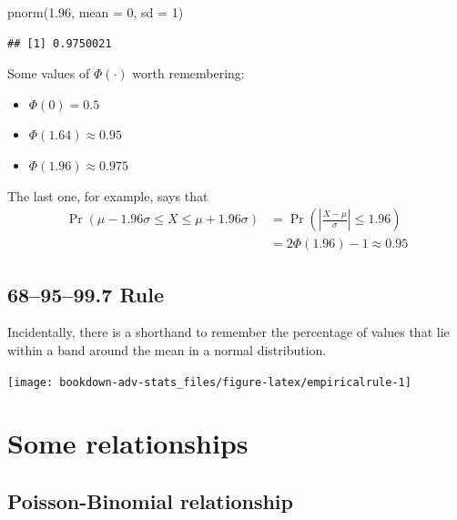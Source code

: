 \documentclass[
]{book}
\newenvironment{Shaded}{\begin{snugshade}}{\end{snugshade}}
\newcommand{\AttributeTok}[1]{\textcolor[rgb]{0.77,0.63,0.00}{#1}}
\newcommand{\DecValTok}[1]{\textcolor[rgb]{0.00,0.00,0.81}{#1}}
\newcommand{\FloatTok}[1]{\textcolor[rgb]{0.00,0.00,0.81}{#1}}
\newcommand{\FunctionTok}[1]{\textcolor[rgb]{0.00,0.00,0.00}{#1}}
\newcommand{\NormalTok}[1]{#1}
\providecommand{\tightlist}{%
  \setlength{\itemsep}{0pt}\setlength{\parskip}{0pt}}
\theoremstyle{definition}
\theoremstyle{definition}
\theoremstyle{definition}
\theoremstyle{definition}
\theoremstyle{remark}
\begin{document}
\begin{Shaded}
\begin{Highlighting}[]
\FunctionTok{pnorm}\NormalTok{(}\FloatTok{1.96}\NormalTok{, }\AttributeTok{mean =} \DecValTok{0}\NormalTok{, }\AttributeTok{sd =} \DecValTok{1}\NormalTok{)}
\end{Highlighting}
\end{Shaded}

\begin{verbatim}
## [1] 0.9750021
\end{verbatim}

Some values of \(\Phi(\cdot)\) worth remembering:

\begin{itemize}
\tightlist
\item
  \(\Phi(0) = 0.5\)
\item
  \(\Phi(1.64) \approx 0.95\)
\item
  \(\Phi(1.96) \approx 0.975\)
\end{itemize}

The last one, for example, says that
\begin{align*}
\Pr(\mu- 1.96\sigma \leq X \leq \mu+ 1.96\sigma) 
&= \Pr\left( \left| \frac{X-\mu}{\sigma} \right| \leq 1.96 \right)\\
&= 2\Phi(1.96)-1\approx 0.95
\end{align*}

\hypertarget{rule}{%
\subsection{68--95--99.7 Rule}\label{rule}}

Incidentally, there is a shorthand to remember the percentage of values that lie within a band around the mean in a normal distribution.

\begin{center}\texttt{[image: bookdown-adv-stats\_files/figure-latex/empiricalrule-1]} \end{center}

\hypertarget{some-relationships}{%
\section{Some relationships}\label{some-relationships}}

\hypertarget{poisson-binomial-relationship}{%
\subsection{Poisson-Binomial relationship}\label{poisson-binomial-relationship}}
\end{document}
